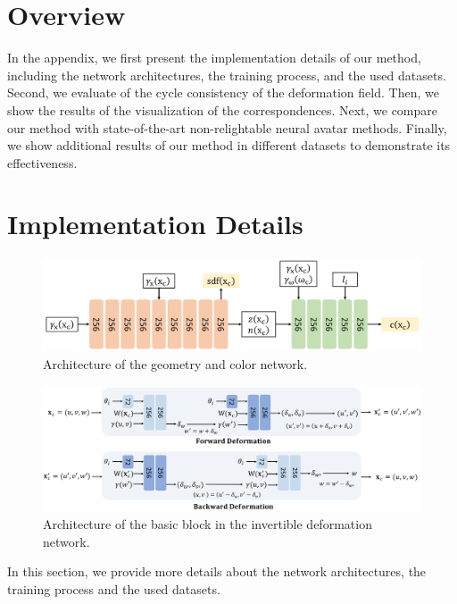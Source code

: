 \section{Overview}

In the appendix, we first present the implementation details of our method, including the network architectures, the training process, and the used datasets. 
Second, we evaluate of the cycle consistency of the deformation field.
Then, we show the results of the visualization of the correspondences.
Next, we compare our method with state-of-the-art non-relightable neural avatar methods.
Finally, we show additional results of our method in different datasets to demonstrate its effectiveness.

\section{Implementation Details}

\begin{figure}[t]
\begin{center}
   \includegraphics[width=0.7\linewidth]{./fig/net_geo.png}
\end{center}
\caption{Architecture of the geometry and color network.}
\label{fig:geo_net}
\end{figure}

\begin{figure}[t]
\begin{center}
   \includegraphics[width=0.85\linewidth]{./fig/net_def.png}
\end{center}
\caption{Architecture of the basic block in the invertible deformation network.}
\label{fig:def_net}
\end{figure}

In this section, we provide more details about the network architectures, the training process and the used datasets.

